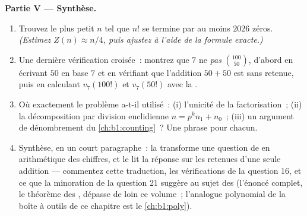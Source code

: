 \begin{problem}
\medskip
\noindent\textbf{Partie V --- Synthèse.}
\begin{enumerate}[resume]
  \item Trouvez le plus petit $n$ tel que $n!$ se termine par au moins
        $2026$ zéros. \emph{(Estimez $Z(n) \approx n/4$, puis
        ajustez à l'aide de la formule exacte.)}
  \item Une dernière vérification croisée~: montrez que $7$ ne  \emph{pas}
        $\binom{100}{50}$, d'abord en écrivant $50$ en base $7$ et
        en vérifiant que l'addition $50 + 50$ est sans retenue, puis
        en calculant $v_7(100!)$ et $v_7(50!)$ avec la .
  \item Où exactement le problème a-t-il utilisé~: (i) l'unicité de la
        factorisation~; (ii) la décomposition par division euclidienne
        $n = p^k n_1 + n_0$~; (iii) un argument de dénombrement du
        \cref{ch:b1:counting}~? Une phrase pour chacun.
  \item Synthèse, en un court paragraphe~: la  transforme
        une question de  en arithmétique des chiffres, et
        le  lit la réponse sur les retenues d'une seule
        addition --- commentez cette traduction, les vérifications de
        la question 16, et ce que la minoration de la question 21 suggère
        au sujet des  (l'énoncé complet, le théorème des
        , dépasse de loin ce volume~; l'analogue polynomial
        de la boîte à outils de ce chapitre est le
        \cref{ch:b1:poly}).
\end{enumerate}
\end{problem}
